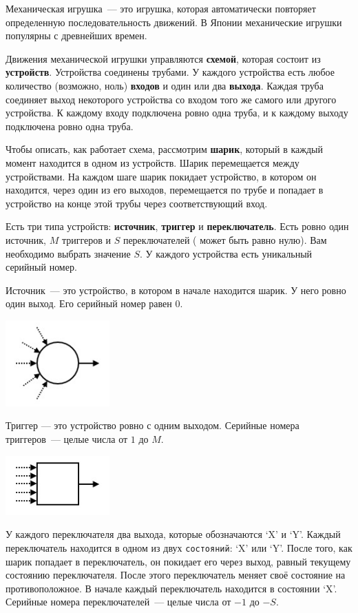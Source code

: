 Механическая игрушка~--- это игрушка, которая автоматически повторяет
определенную последовательность движений. В Японии механические игрушки
популярны с древнейших времен.

Движения механической игрушки управляются \textbf{схемой}, которая состоит из
\textbf{устройств}. Устройства соединены трубами. У каждого устройства есть любое
количество (возможно, ноль) \textbf{входов} и один или два \textbf{выхода}. Каждая труба
соединяет выход некоторого устройства со входом того же самого или другого
устройства. К каждому входу подключена ровно одна труба, и к каждому выходу
подключена ровно одна труба.

Чтобы описать, как работает схема, рассмотрим \textbf{шарик}, который в каждый
момент находится в одном из устройств. Шарик перемещается между
устройствами. На каждом шаге шарик покидает устройство, в котором он
находится, через один из его выходов, перемещается по трубе и попадает в
устройство на конце этой трубы через соответствующий вход.

Есть три типа устройств: \textbf{источник}, \textbf{триггер} и \textbf{переключатель}. Есть ровно один
источник, $M$ триггеров и $S$ переключателей ( может быть равно нулю). Вам
необходимо выбрать значение $S$. У каждого устройства есть уникальный
серийный номер.

Источник~--- это устройство, в котором в начале находится шарик. У него ровно
один выход. Его серийный номер равен $0$.

\includegraphics{1.png}


Триггер --- это устройство ровно с одним выходом. Серийные номера триггеров~---
целые числа от $1$ до $M$.

\includegraphics{2.png}

У каждого переключателя два выхода, которые обозначаются `X' и `Y'. Каждый
переключатель находится в одном из двух \texttt{состояний}: `X' или `Y'. После того, как
шарик попадает в переключатель, он покидает его через выход, равный текущему
состоянию переключателя. После этого переключатель меняет своё состояние на
противоположное. В начале каждый переключатель находится в состоянии `X'.
Серийные номера переключателей~--- целые числа от $-1$ до $-S$.

